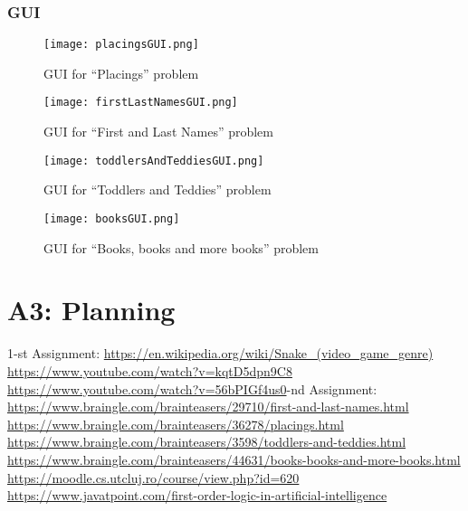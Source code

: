 \documentclass[a4paper,12pt]{report}
\begin{document}
\subsection{GUI}
\begin{figure}[h]
\texttt{[image: placingsGUI.png]}
\centering
\caption{GUI for ``Placings'' problem}
\end{figure}

\begin{figure}[h]
\texttt{[image: firstLastNamesGUI.png]}
\centering
\caption{GUI for ``First and Last Names'' problem}
\end{figure}

\begin{figure}[h]
\texttt{[image: toddlersAndTeddiesGUI.png]}
\centering
\caption{GUI for ``Toddlers and Teddies'' problem}
\end{figure}

\begin{figure}[h]
\texttt{[image: booksGUI.png]}
\centering
\caption{GUI for ``Books, books and more books'' problem}
\end{figure}

\chapter{A3: Planning}



1-st Assignment:\newline \newline
\href{URL}{https://en.wikipedia.org/wiki/Snake\_(video\_game\_genre)}\\
\href{URL}{https://www.youtube.com/watch?v=kqtD5dpn9C8}\\
\href{URL}{https://www.youtube.com/watch?v=56bPIGf4us0}\newline {}-nd Assignment:\newline \newline
\href{URL}{https://www.braingle.com/brainteasers/29710/first-and-last-names.html}\\
\href{URL}{https://www.braingle.com/brainteasers/36278/placings.html}\\
\href{URL}{https://www.braingle.com/brainteasers/3598/toddlers-and-teddies.html}\\
\href{URL}{https://www.braingle.com/brainteasers/44631/books-books-and-more-books.html}\\
\href{URL}{https://moodle.cs.utcluj.ro/course/view.php?id=620}\\
\href{URL}{https://www.javatpoint.com/first-order-logic-in-artificial-intelligence}\\
\appendix
\end{document}
